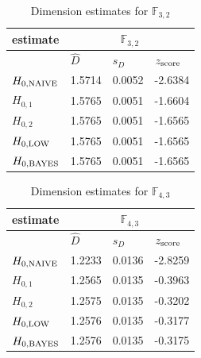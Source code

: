 \documentclass[a4paper,10pt]{article}
\begin{document}
\begin{thebibliography}{99}
\begin{table}[H] 
\begin{center}
\caption{Dimension estimates for $\mathbb{F}_{3,2}$}
\label{tab:est1}
\begin{tabular}{|l|l|l|l|}
\hline
 estimate & \multicolumn{3}{c|}{$\mathbb{F}_{3,2}$} \\
\hline
 & $\hat{D}$ & $s_{D}$ & $z_{\mbox{\scriptsize{score}}}$ \\
\hline 
$ H_{0,\mbox{\scriptsize{NAIVE}}} $ & 1.5714 & 0.0052 & -2.6384 \\ 
\hline 
$ H_{0,1} $ & 1.5765 & 0.0051 & -1.6604 \\ 
\hline 
$ H_{0,2} $ & 1.5765 & 0.0051 & -1.6565 \\ 
\hline 
$ H_{0,\mbox{\scriptsize{LOW}}} $ & 1.5765 & 0.0051 & -1.6565 \\ 
\hline 
$ H_{0,\mbox{\scriptsize{BAYES}}} $ & 1.5765 & 0.0051 & -1.6565 \\ 
\hline 
\end{tabular}
\end{center}
\end{table} 

\begin{table}[H] 
\begin{center}
\caption{Dimension estimates for $\mathbb{F}_{4,3}$}
\label{tab:est2}
\begin{tabular}{|l|l|l|l|}
\hline
 estimate & \multicolumn{3}{c|}{$\mathbb{F}_{4,3}$} \\
\hline
 & $\hat{D}$ & $s_{D}$ & $z_{\mbox{\scriptsize{score}}}$ \\
\hline 
$ H_{0,\mbox{\scriptsize{NAIVE}}} $ & 1.2233 & 0.0136 & -2.8259 \\ 
\hline 
$ H_{0,1} $ & 1.2565 & 0.0135 & -0.3963 \\ 
\hline 
$ H_{0,2} $ & 1.2575 & 0.0135 & -0.3202 \\ 
\hline 
$ H_{0,\mbox{\scriptsize{LOW}}} $ & 1.2576 & 0.0135 & -0.3177 \\ 
\hline 
$ H_{0,\mbox{\scriptsize{BAYES}}} $ & 1.2576 & 0.0135 & -0.3175 \\ 
\hline  
\end{tabular}
\end{center}
\end{table} 


\end{thebibliography}
\end{document}
